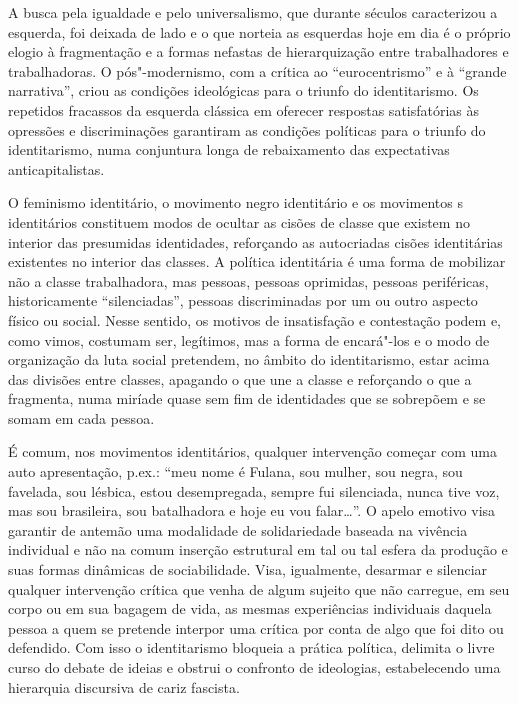 A busca pela igualdade e pelo universalismo, que durante séculos
caracterizou a esquerda, foi deixada de lado e o que norteia as
esquerdas hoje em dia é o próprio elogio à fragmentação e a formas
nefastas de hierarquização entre trabalhadores e trabalhadoras. O
pós"-modernismo, com a crítica ao ``eurocentrismo'' e à ``grande
narrativa'', criou as condições ideológicas para o triunfo do
identitarismo. Os repetidos fracassos da esquerda clássica em oferecer
respostas satisfatórias às opressões e discriminações garantiram as
condições políticas para o triunfo do identitarismo, numa conjuntura
longa de rebaixamento das expectativas anticapitalistas.

O feminismo identitário, o movimento negro identitário e os movimentos
s identitários constituem modos de ocultar as cisões de classe que
existem no interior das presumidas identidades, reforçando as
autocriadas cisões identitárias existentes no interior das classes. A
política identitária é uma forma de mobilizar não a classe trabalhadora,
mas pessoas, pessoas oprimidas, pessoas periféricas, historicamente
``silenciadas'', pessoas discriminadas por um ou outro aspecto físico ou
social. Nesse sentido, os motivos de insatisfação e contestação podem e,
como vimos, costumam ser, legítimos, mas a forma de encará"-los e o modo
de organização da luta social pretendem, no âmbito do identitarismo,
estar acima das divisões entre classes, apagando o que une a classe e
reforçando o que a fragmenta, numa miríade quase sem fim de identidades
que se sobrepõem e se somam em cada pessoa.

É comum, nos movimentos identitários, qualquer intervenção começar com
uma auto apresentação, p.ex.: ``meu nome é Fulana, sou mulher, sou
negra, sou favelada, sou lésbica, estou desempregada, sempre fui
silenciada, nunca tive voz, mas sou brasileira, sou batalhadora e hoje
eu vou falar\ldots{}''. O apelo emotivo visa garantir de antemão uma
modalidade de solidariedade baseada na vivência individual e não na
comum inserção estrutural em tal ou tal esfera da produção e suas formas
dinâmicas de sociabilidade. Visa, igualmente, desarmar e silenciar
qualquer intervenção crítica que venha de algum sujeito que não
carregue, em seu corpo ou em sua bagagem de vida, as mesmas experiências
individuais daquela pessoa a quem se pretende interpor uma crítica por
conta de algo que foi dito ou defendido. Com isso o identitarismo
bloqueia a prática política, delimita o livre curso do debate de ideias
e obstrui o confronto de ideologias, estabelecendo uma hierarquia
discursiva de cariz fascista.

